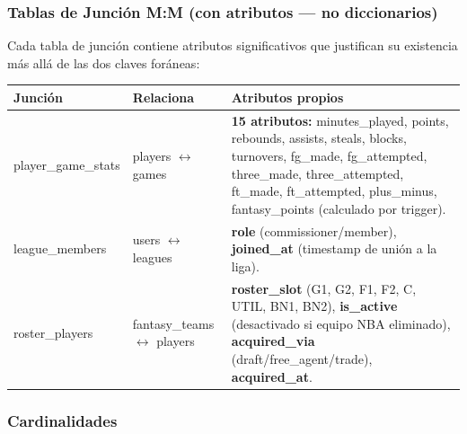 \documentclass[12pt,a4paper]{article}
\begin{document}
\subsubsection{Tablas de Junci\'on M:M (con atributos --- no diccionarios)}

Cada tabla de junci\'on contiene atributos significativos que justifican su existencia
m\'as all\'a de las dos claves for\'aneas:

\begin{longtable}{>{\ttfamily\small}p{3.5cm} p{3.5cm} p{7cm}}
\toprule
\normalfont\textbf{Junci\'on} & \textbf{Relaciona} & \textbf{Atributos propios} \\
\midrule
\endhead
player\_game\_stats & players $\leftrightarrow$ games &
    \textbf{15 atributos:} minutes\_played, points, rebounds, assists, steals, blocks, turnovers,
    fg\_made, fg\_attempted, three\_made, three\_attempted, ft\_made, ft\_attempted, plus\_minus,
    fantasy\_points (calculado por trigger). \\[6pt]
league\_members & users $\leftrightarrow$ leagues &
    \textbf{role} (commissioner/member), \textbf{joined\_at} (timestamp de uni\'on a la liga). \\[6pt]
roster\_players & fantasy\_teams $\leftrightarrow$ players &
    \textbf{roster\_slot} (G1, G2, F1, F2, C, UTIL, BN1, BN2), \textbf{is\_active} (desactivado si equipo NBA eliminado),
    \textbf{acquired\_via} (draft/free\_agent/trade), \textbf{acquired\_at}. \\
\bottomrule
\end{longtable}

\subsubsection{Cardinalidades}
\end{document}
